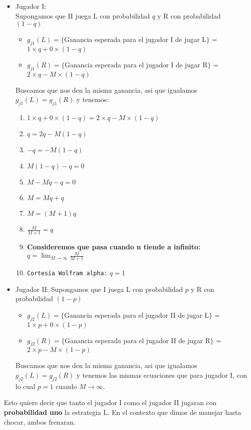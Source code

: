 \begin{itemize}
	\item Jugador I:\\
	Supongamos que II juega L con probabilidad $q$ y R con probabilidad $(1-q)$
	\begin{itemize}
		\item $g_{j1}(L) = \{$Ganancia esperada para el jugador I de jugar L$\}$ = $1 \times q + 0 \times (1-q)$ 
		\item $g_{j1}(R) = \{$Ganancia esperada para el jugador I  de jugar R$\}$ = $2 \times q - M \times (1-q)$ 
	\end{itemize}
	Buscamos que nos den la misma ganancia, asi que igualamos $g_{j1}(L) = g_{j1}(R)$ y tenemos:
	\begin{enumerate}
		\item $1 \times q + 0 \times (1-q) = 2 \times q - M \times (1-q)$ 
		\item $q = 2q - M(1-q)$ 
		\item $-q = - M(1-q)$ 
		\item $ M(1-q) -q = 0$ 
		\item $ M-Mq-q = 0$ 
		\item $ M = Mq+q$ 
		\item $ M = (M+1)q$ 
		\item $ \frac{M}{M+1} = q$ 
		\item \textbf{Consideremos que pasa cuando n tiende a infinito:} $ q = \displaystyle\lim_{M \to \infty} \frac{M}{M+1}$ 
		\item \texttt{Cortes\'ia Wolfram alpha:} $ q = 1$ 

	\end{enumerate}	

	\item Jugador II:
	Supongamos que I juega L con probabilidad $p$ y R con probabilidad $(1-p)$
	\begin{itemize}
		\item $g_{j2}(L) = \{$Ganancia esperada para el jugador II de jugar L$\}$ = $1 \times p + 0 \times (1-p)$ 
		\item $g_{j2}(R) = \{$Ganancia esperada para el jugador II  de jugar R$\}$ = $2 \times p - M \times (1-p)$ 
	\end{itemize}
	Buscamos que nos den la misma ganancia, asi que igualamos $g_{j2}(L) = g_{j2}(R)$ y tenemos las mismas ecuaciones que para jugador I, con lo cual $p=1$ cuando $M \to \infty$.
\end{itemize}
Esto quiere decir que tanto el jugador I como el jugador II jugaran con \textbf{probabilidad uno} la estrategia L. En el contexto que dimos de manejar hasta chocar, ambos frenaran.



